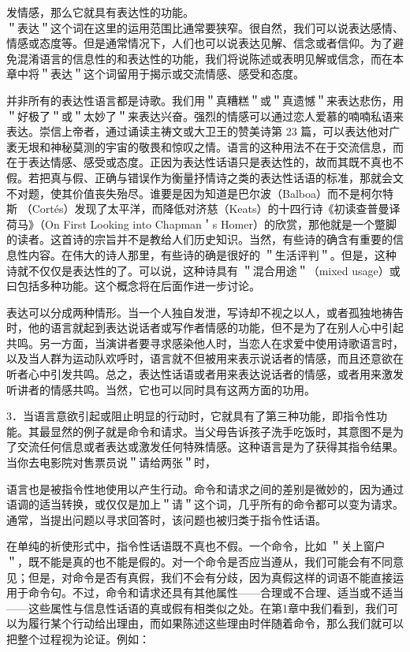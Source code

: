 发情感，那么它就具有表达性的功能。\\
＂表达＂这个词在这里的运用范围比通常要狭窄。很自然，我们可以说表达感情、情感或态度等。但是通常情况下，人们也可以说表达见解、信念或者信仰。为了避免混淆语言的信息性的和表达性的功能，我们将说陈述或表明见解或信念，而在本章中将＂表达＂这个词留用于揭示或交流情感、感受和态度。

并非所有的表达性语言都是诗歌。我们用＂真糟糕＂或＂真遗憾＂来表达悲伤，用＂好极了＂或＂太妙了＂来表达兴奋。强烈的情感可以通过恋人爱慕的喃喃私语来表达。崇信上帝者，通过诵读主祷文或大卫王的赞美诗第 23 篇，可以表达他对广袤无垠和神秘莫测的宇宙的敬畏和惊叹之情。语言的这种用法不在于交流信息，而在于表达情感、感受或态度。正因为表达性话语只是表达性的，故而其既不真也不假。若把真与假、正确与错误作为衡量抒情诗之类的表达性话语的标准，那就会文不对题，使其价值丧失殆尽。谁要是因为知道是巴尔波（Balboa）而不是柯尔特斯 （Cortés）发现了太平洋，而降低对济慈（Keats）的十四行诗《初读查普曼译荷马》（On First Looking into Chapman＇s Homer）的欣赏，那他就是一个蹩脚的读者。这首诗的宗旨并不是教给人们历史知识。当然，有些诗的确含有重要的信息性内容。在伟大的诗人那里，有些诗的确是很好的 ＂生活评判＂。但是，这种诗就不仅仅是表达性的了。可以说，这种诗具有 ＂混合用途＂（mixed usage）或曰包括多种功能。这个概念将在后面作进一步讨论。

表达可以分成两种情形。当一个人独自发泄，写诗却不视之以人，或者孤独地祷告时，他的语言就起到表达说话者或写作者情感的功能，但不是为了在别人心中引起共鸣。另一方面，当演讲者要寻求感染他人时，当恋人在求爱中使用诗歌语言时，以及当人群为运动队欢呼时，语言就不但被用来表示说话者的情感，而且还意欲在听者心中引发共鸣。总之，表达性话语或者用来表达说话者的情感，或者用来激发听讲者的情感共鸣。当然，它也可以同时具有这两方面的功用。

3．当语言意欲引起或阻止明显的行动时，它就具有了第三种功能，即指令性功能。其最显然的例子就是命令和请求。当父母告诉孩子洗手吃饭时，其意图不是为了交流任何信息或者表达或激发任何特殊情感。这种语言是为了获得其指令结果。当你去电影院对售票员说＂请给两张＂时，

语言也是被指令性地使用以产生行动。命令和请求之间的差别是微妙的，因为通过语调的适当转换，或仅仅是加上＂请＂这个词，几乎所有的命令都可以变为请求。通常，当提出问题以寻求回答时，该问题也被归类于指令性话语。

在单纯的祈使形式中，指令性话语既不真也不假。一个命令，比如 ＂关上窗户＂，既不能是真的也不能是假的。对一个命令是否应当遵从，我们可能会有不同意见；但是，对命令是否有真假，我们不会有分歧，因为真假这样的词语不能直接运用于命令句。不过，命令和请求还具有其他属性——合理或不合理、适当或不适当——这些属性与信息性话语的真或假有相类似之处。在第1章中我们看到，我们可以为履行某个行动给出理由，而如果陈述这些理由时伴随着命令，那么我们就可以把整个过程视为论证。例如：

